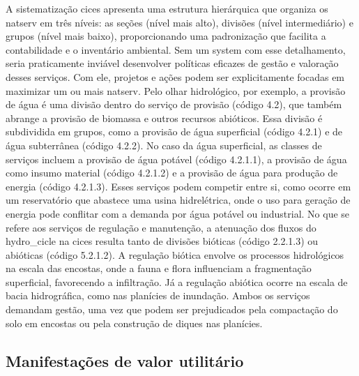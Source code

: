 \documentclass[./main.tex]{subfiles}
\begin{document}
\par A sistematização \acrshort{cices} apresenta uma estrutura hierárquica que organiza os \gls{natserv} em três níveis: as seções (nível mais alto), divisões (nível intermediário) e grupos (nível mais baixo), proporcionando uma padronização que facilita a contabilidade e o inventário ambiental. Sem um \gls{system} com esse detalhamento, seria praticamente inviável desenvolver políticas eficazes de gestão e valoração desses serviços. Com ele, projetos e ações podem ser explicitamente focadas em maximizar um ou mais \gls{natserv}. Pelo olhar hidrológico, por exemplo, a provisão de água é uma divisão dentro do serviço de provisão (código 4.2), que também abrange a provisão de biomassa e outros recursos abióticos. Essa divisão é subdividida em grupos, como a provisão de água superficial (código 4.2.1) e de água subterrânea (código 4.2.2). No caso da água superficial, as classes de serviços incluem a provisão de água potável (código 4.2.1.1), a provisão de água como insumo material (código 4.2.1.2) e a provisão de água para produção de energia (código 4.2.1.3). Esses serviços podem competir entre si, como ocorre em um reservatório que abastece uma usina hidrelétrica, onde o uso para geração de energia pode conflitar com a demanda por água potável ou industrial. No que se refere aos serviços de regulação e manutenção, a atenuação dos fluxos do \gls{hydro_cicle} na \acrshort{cices} resulta tanto de divisões bióticas (código 2.2.1.3) ou abióticas (código 5.2.1.2). A regulação biótica envolve os processos hidrológicos na escala das encostas, onde a fauna e flora influenciam a fragmentação superficial, favorecendo a infiltração. Já a regulação abiótica ocorre na escala de bacia hidrográfica, como nas planícies de inundação. Ambos os serviços demandam gestão, uma vez que podem ser prejudicados pela compactação do solo em encostas ou pela construção de diques nas planícies.


\subsection{Manifestações de valor utilitário} \label{sec:natserv:value}
\end{document}
